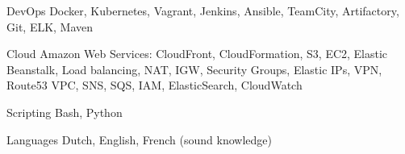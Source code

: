 

\begin{cvskills}

  \cvskill
    {DevOps} %
    {Docker, Kubernetes, Vagrant, Jenkins, Ansible, TeamCity, Artifactory, Git, ELK, Maven} %

  \cvskill
    {Cloud} %
    {Amazon Web Services: CloudFront, CloudFormation, S3, EC2, Elastic Beanstalk, Load balancing, NAT, IGW, Security Groups, Elastic IPs, VPN, Route53 VPC, SNS, SQS, IAM, ElasticSearch, CloudWatch} %

  \cvskill
    {Scripting} %
    {Bash, Python} %

  \cvskill
    {Languages} %
    {Dutch, English, French (sound knowledge)} %

\end{cvskills}
